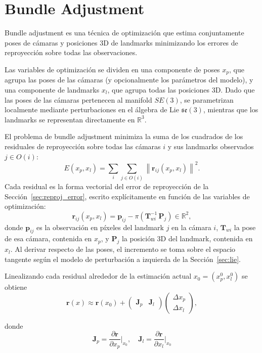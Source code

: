 \section{Bundle Adjustment}

Bundle adjustment es una técnica de optimización que estima conjuntamente poses de cámaras y posiciones 3D de landmarks minimizando los errores de reproyección sobre todas las observaciones.

Las variables de optimización se dividen en una componente de poses $x_p$, que agrupa las poses de las cámaras (y opcionalmente los parámetros del modelo), y una componente de landmarks $x_l$, que agrupa todas las posiciones 3D. Dado que las poses de las cámaras pertenecen al manifold $SE(3)$, se parametrizan localmente mediante perturbaciones en el álgebra de Lie $\mathfrak{se}(3)$, mientras que los landmarks se representan directamente en $\mathbb{R}^3$.

El problema de bundle adjustment minimiza la suma de los cuadrados de los residuales de reproyección sobre todas las cámaras $i$ y sus landmarks observados $j \in O(i)$:
\[
E(x_p, x_l)
=
\sum_i \sum_{j \in O(i)}
\left\|
\mathbf{r}_{ij}(x_p, x_l)
\right\|^2.
\]
Cada residual es la forma vectorial del error de reproyección de la Sección~\ref{sec:reproj_error}, escrito explícitamente en función de las variables de optimización:
\[
\mathbf{r}_{ij}(x_p, x_l)
=
\mathbf{p}_{ij} - \pi\!\left(\mathbf{T}_{wi}^{-1}\,\mathbf{P}_j\right)
\in \mathbb{R}^2,
\]
donde $\mathbf{p}_{ij}$ es la observación en píxeles del landmark $j$ en la cámara $i$, $\mathbf{T}_{wi}$ la pose de esa cámara, contenida en $x_p$, y $\mathbf{P}_j$ la posición 3D del landmark, contenida en $x_l$. Al derivar respecto de las poses, el incremento se toma sobre el espacio tangente según el modelo de perturbación a izquierda de la Sección~\ref{sec:lie}.

Linealizando cada residual alrededor de la estimación actual $x_0 = (x_p^0, x_l^0)$ se obtiene
\[
\mathbf{r}(x)
\approx
\mathbf{r}(x_0)
+
\begin{pmatrix}
\mathbf{J}_{p} & \mathbf{J}_{l}
\end{pmatrix}
\begin{pmatrix}
\Delta x_p \\
\Delta x_l
\end{pmatrix},
\]

donde
\[
\mathbf{J}_{p} = \frac{\partial \mathbf{r}}{\partial x_p} \Big|_{x_0}, \quad
\mathbf{J}_{l} = \frac{\partial \mathbf{r}}{\partial x_l} \Big|_{x_0}
\]

